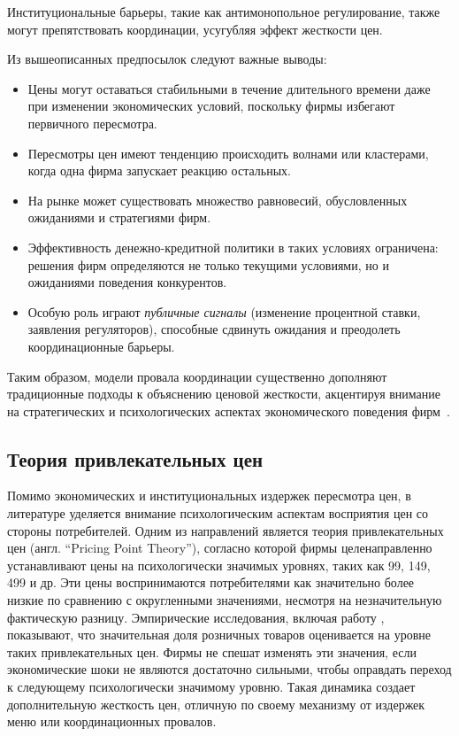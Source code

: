 Институциональные барьеры, такие как антимонопольное регулирование, также могут препятствовать координации, усугубляя эффект жесткости цен.

Из вышеописанных предпосылок следуют важные выводы:

\begin{itemize}
	\item Цены могут оставаться стабильными в течение длительного времени даже при изменении экономических условий, поскольку фирмы избегают первичного пересмотра.
	\item Пересмотры цен имеют тенденцию происходить волнами или кластерами, когда одна фирма запускает реакцию остальных.
	\item На рынке может существовать множество равновесий, обусловленных ожиданиями и стратегиями фирм.
	\item Эффективность денежно-кредитной политики в таких условиях ограничена: решения фирм определяются не только текущими условиями, но и ожиданиями поведения конкурентов.
	\item Особую роль играют \textit{публичные сигналы} (изменение процентной ставки, заявления регуляторов), способные сдвинуть ожидания и преодолеть координационные барьеры.
\end{itemize}

Таким образом, модели провала координации существенно дополняют традиционные подходы к объяснению ценовой жесткости, акцентируя внимание на стратегических и психологических аспектах экономического поведения фирм~\cite{BallRomer1987, CooperJohn1988}.

\subsection{Теория привлекательных цен}\label{subsec:ch1/sec2/sub2}

Помимо экономических и институциональных издержек пересмотра цен, в литературе уделяется внимание психологическим аспектам восприятия цен со стороны потребителей. Одним из направлений является теория привлекательных цен (англ. ``Pricing Point Theory''), согласно которой фирмы целенаправленно устанавливают цены на психологически значимых уровнях, таких как 99, 149, 499 и др. Эти цены воспринимаются потребителями как значительно более низкие по сравнению с округленными значениями, несмотря на незначительную фактическую разницу. Эмпирические исследования, включая работу \cite{Kashyap1995}, показывают, что значительная доля розничных товаров оценивается на уровне таких привлекательных цен. Фирмы не спешат изменять эти значения, если экономические шоки не являются достаточно сильными, чтобы оправдать переход к следующему психологически значимому уровню. Такая динамика создает дополнительную жесткость цен, отличную по своему механизму от издержек меню или координационных провалов. 

